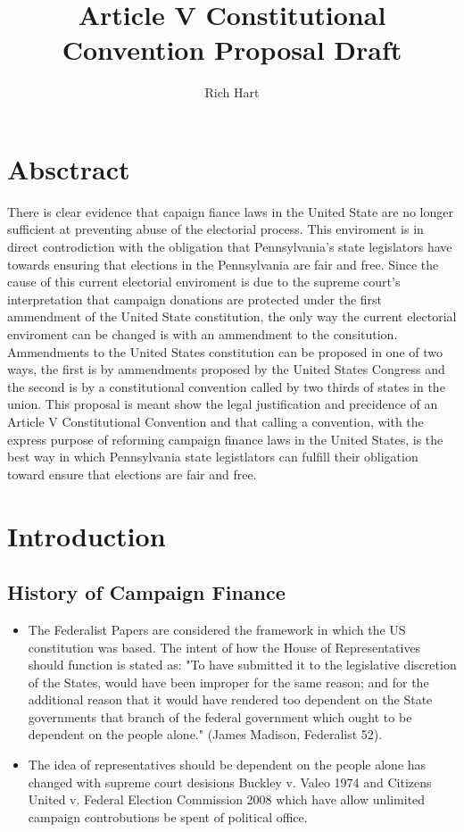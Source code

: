 \documentclass[11pt]{article} %
\title{Article V Constitutional Convention Proposal Draft}
\author{Rich Hart}
\begin{document}
\maketitle

\section{Absctract}

	There is clear evidence that capaign fiance laws in the United State are no longer sufficient at preventing abuse of the electorial process.  This enviroment is in direct controdiction with the obligation that Pennsylvania's state legislators have towards ensuring that elections in the Pennsylvania are fair and free.   Since the cause of this current electorial enviroment is due to the supreme court's interpretation that campaign donations are protected under the first ammendment of the United State constitution, the only way the current electorial enviroment can be changed is with an ammendment to the consitution.  Ammendments to the United States constitution can be proposed in one of two ways,  the first is by ammendments proposed by the United States Congress and the second is by a constitutional convention called by two thirds of states in the union.   This proposal is meant show the legal justification and precidence of an Article V Constitutional Convention and that calling a convention, with the express purpose of reforming campaign finance laws in the United States, is the best way in which Pennsylvania state legistlators can fulfill their obligation toward ensure that elections are fair and free.  

\section{Introduction}

\subsection{History of Campaign Finance }

\begin{itemize}

\item  The Federalist Papers are considered the framework in which the US constitution was based.   The intent of how the House of Representatives should function is stated as: "To have submitted it to the legislative discretion of the States, would have been improper for the same reason; and for the additional reason that it would have rendered too dependent on the State governments that branch of the federal government which ought to be dependent on the people alone." (James Madison, Federalist 52).

\item The idea of representatives should be dependent on the people alone has changed with supreme court desisions Buckley v. Valeo 1974 and Citizens United v. Federal Election Commission 2008 which have allow unlimited campaign controbutions be spent of political office. 
\end{itemize} 
\end{document}
